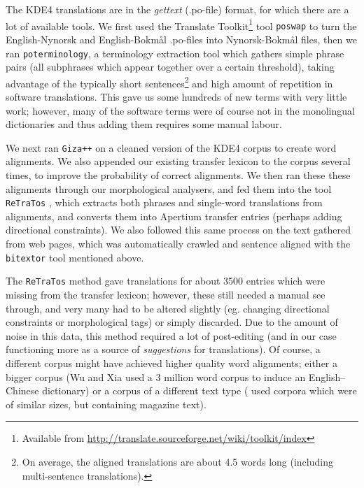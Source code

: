 \documentclass[11pt]{article}
\begin{document}
The KDE4 translations are in the \emph{gettext} (.po-file) format, for
which there are a lot of available tools. We first used the Translate
Toolkit\footnote{Available from
  \href{http://translate.sourceforge.net/wiki/toolkit/index}{http://translate.sourceforge.net/wiki/toolkit/index}
} tool {\tt poswap} to turn the English-Nynorsk and English-Bokmål
.po-files into Nynorsk-Bokmål files, then we ran
{\tt poterminology}, a terminology extraction tool which gathers
simple phrase pairs (all subphrases which appear together over a
certain threshold), taking advantage of the typically short
sentences\footnote{On average, the aligned translations are about 4.5
  words long (including multi-sentence translations).} and high amount
of repetition in software translations. This gave us some hundreds of
new terms with very little work; however, many of the software terms
were of course not in the monolingual dictionaries and thus adding
them requires some manual labour.

We next ran {\tt Giza++} \citep{och2003scv} on a cleaned version of the KDE4
corpus to create word alignments. We also appended our existing
transfer lexicon to the corpus several times, to improve the
probability of correct alignments. We then ran these these alignments
through our morphological analysers, and fed them into the tool
{\tt ReTraTos} \citep{caseli2006aib}, which extracts both phrases and
single-word translations from alignments, and converts them into
Apertium transfer entries (perhaps adding directional constraints). We
also followed this same process on the text gathered from web pages,
which was automatically crawled and sentence aligned with the {\tt bitextor}
tool mentioned above.

The {\tt ReTraTos} method gave translations for about 3500 entries which
were missing from the transfer lexicon; however, these still needed a
manual see through, and very many had to be altered slightly (eg.
changing directional constraints or morphological tags) or simply
discarded. Due to the amount of noise in this data, this method
required a lot of post-editing (and in our case functioning more as a
source of \emph{suggestions} for translations). Of course, a different
corpus might have achieved higher quality word alignments; either a
bigger corpus (Wu and Xia \citep[1994, in][p.~230]{caseli2006aib} used
a 3 million word corpus to induce an English–Chinese dictionary) or a
corpus of a different text type (\citet{caseli2006aib} used corpora
which were of similar sizes, but containing magazine text).
\end{document}
